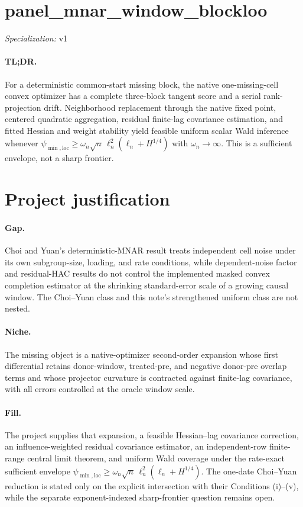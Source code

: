 \documentclass{article}
\begin{document}
\sloppy

\section*{panel\_\allowbreak{}mnar\_\allowbreak{}window\_\allowbreak{}blockloo}

\noindent\textit{Specialization:} v1\par

\paragraph{TL;DR.} For a deterministic common-start missing block, the native one-missing-cell convex optimizer has a complete three-block tangent score and a serial rank-projection drift. Neighborhood replacement through the native fixed point, centered quadratic aggregation, residual finite-lag covariance estimation, and fitted Hessian and weight stability yield feasible uniform scalar Wald inference whenever \(\psi_{\min,\mathrm{loc}}\ge\omega_n\sqrt n\,\ell_n^2(\ell_n+H^{1/4})\) with \(\omega_n\to\infty\). This is a sufficient envelope, not a sharp frontier.

\section{Project justification}

\paragraph{Gap.} Choi and Yuan's deterministic-MNAR result treats independent cell noise under its own subgroup-size, loading, and rate conditions, while dependent-noise factor and residual-HAC results do not control the implemented masked convex completion estimator at the shrinking standard-error scale of a growing causal window. The Choi--Yuan class and this note's strengthened uniform class are not nested.

\paragraph{Niche.} The missing object is a native-optimizer second-order expansion whose first differential retains donor-window, treated-pre, and negative donor-pre overlap terms and whose projector curvature is contracted against finite-lag covariance, with all errors controlled at the oracle window scale.

\paragraph{Fill.} The project supplies that expansion, a feasible Hessian--lag covariance correction, an influence-weighted residual covariance estimator, an independent-row finite-range central limit theorem, and uniform Wald coverage under the rate-exact sufficient envelope \(\psi_{\min,\mathrm{loc}}\ge\omega_n\sqrt n\,\ell_n^2(\ell_n+H^{1/4})\). The one-date Choi--Yuan reduction is stated only on the explicit intersection with their Conditions (i)--(v), while the separate exponent-indexed sharp-frontier question remains open.
\end{document}
